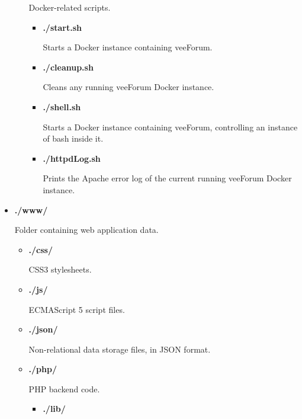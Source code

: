 \documentclass[12pt]{report}
\renewcommand\emph{\textbf}
\begin{document}
\begin{itemize}
\begin{itemize}
                        Docker-related scripts.
                        \begin{itemize}
                            \item \emph{./start.sh}

                            Starts a Docker instance containing veeForum.

                            \item \emph{./cleanup.sh}

                            Cleans any running veeForum Docker instance.

                            \item \emph{./shell.sh}

                            Starts a Docker instance containing veeForum, controlling an instance of bash inside it.

                            \item \emph{./httpdLog.sh}

                            Prints the Apache error log of the current running veeForum Docker instance.
                        \end{itemize}

                    \end{itemize}

                \item \emph{./www/}

                    Folder containing web application data.
                    \begin{itemize}

                        \item \emph{./css/}

                        CSS3 stylesheets.

                        \item \emph{./js/}

                        ECMAScript 5 script files.

                        \item \emph{./json/}

                        Non-relational data storage files, in JSON format.

                        \item \emph{./php/}

                        PHP backend code.
                        \begin{itemize}
                            \item \emph{./lib/}


\end{itemize}
\end{itemize}
\end{itemize}
\end{document}
